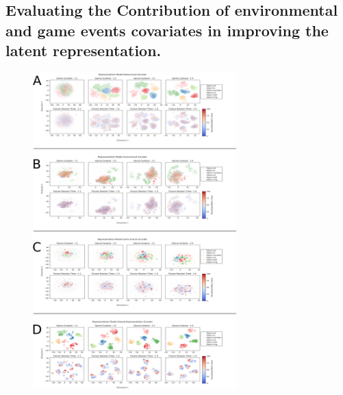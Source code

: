 \subsection{Evaluating the Contribution of environmental and game events covariates in improving the latent representation.}
\begin{figure}[ht]
\centering
\includegraphics[width=0.7\textwidth]{images/chapter_4/rnn_full_complete_umap.png}

\end{figure}

